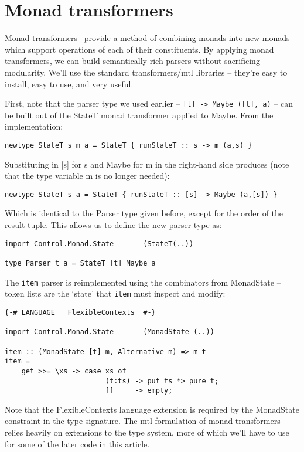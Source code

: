 \documentclass{tmr}
\begin{document}
\section{Monad transformers}
Monad transformers~\cite{liang} provide a method of combining monads into
new monads which support operations of each of their constituents.  
By applying monad transformers, we can build semantically rich parsers without sacrificing modularity.
We'll use the standard transformers/mtl \cite{mtl} libraries -- 
they're easy to install, easy to use, and very useful.

First, note that the parser type we used earlier -- \verb+[t] -> Maybe ([t], a)+
-- can be built out of the StateT monad transformer applied to Maybe.
From the implementation:
\begin{verbatim}
newtype StateT s m a = StateT { runStateT :: s -> m (a,s) }
\end{verbatim}
Substituting in [s] for s and Maybe for m in the right-hand side produces
(note that the type variable m is no longer needed):
\begin{verbatim}
newtype StateT s a = StateT { runStateT :: [s] -> Maybe (a,[s]) }
\end{verbatim}
Which is identical to the Parser type given before, except for the order 
of the result tuple.
This allows us to define the new parser type as:
\begin{verbatim}
import Control.Monad.State       (StateT(..))

type Parser t a = StateT [t] Maybe a
\end{verbatim}

The \verb+item+ parser is reimplemented using the combinators from MonadState --
token lists are the `state' that \verb+item+ must inspect and modify:
\begin{verbatim}
{-# LANGUAGE   FlexibleContexts  #-}

import Control.Monad.State       (MonadState (..))

item :: (MonadState [t] m, Alternative m) => m t
item =
    get >>= \xs -> case xs of
                        (t:ts) -> put ts *> pure t;
                        []     -> empty;
\end{verbatim}
Note that the FlexibleContexts language extension is required by the 
MonadState constraint in the type signature.  The mtl formulation of monad
transformers relies heavily on extensions to the type system, more of which 
we'll have to use for some of the later code in this article.
\end{document}
